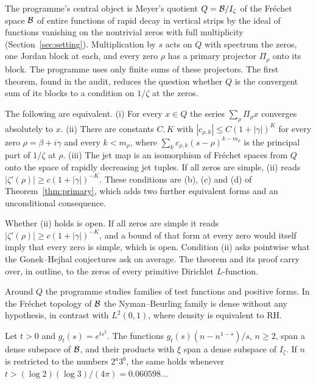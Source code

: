 The programme's central object is Meyer's quotient $Q=\mathcal{B}/I_\zeta$ of the Fréchet space $\mathcal{B}$ of entire functions of rapid decay in vertical strips by the ideal of functions vanishing on the nontrivial zeros with full multiplicity (Section~\ref{sec:setting}). Multiplication by $s$ acts on $Q$ with spectrum the zeros, one Jordan block at each, and every zero $\rho$ has a primary projector $\Pi_\rho$ onto its block. The programme uses only finite sums of these projectors. The first theorem, found in the audit, reduces the question whether $Q$ is the convergent sum of its blocks to a condition on $1/\zeta$ at the zeros.

\begin{introthm}
The following are equivalent.
(i) For every $x\in Q$ the series $\sum_\rho\Pi_\rho x$ converges absolutely to $x$.
(ii) There are constants $C,K$ with $|c_{\rho,k}|\le C(1+|\gamma|)^K$ for every zero $\rho=\beta+i\gamma$ and every $k<m_\rho$, where $\sum_kc_{\rho,k}(s-\rho)^{k-m_\rho}$ is the principal part of $1/\zeta$ at $\rho$.
(iii) The jet map is an isomorphism of Fréchet spaces from $Q$ onto the space of rapidly decreasing jet tuples.
If all zeros are simple, (ii) reads $|\zeta'(\rho)|\ge c(1+|\gamma|)^{-K}$. These conditions are (b), (c) and (d) of Theorem~\ref{thm:primary}, which adds two further equivalent forms and an unconditional consequence.
\end{introthm}

Whether (ii) holds is open. If all zeros are simple it reads $|\zeta'(\rho)|\ge c(1+|\gamma|)^{-K}$, and a bound of that form at every zero would itself imply that every zero is simple, which is open. Condition (ii) asks pointwise what the Gonek--Hejhal conjectures ask on average. The theorem and its proof carry over, in outline, to the zeros of every primitive Dirichlet $L$-function.

Around $Q$ the programme studies families of test functions and positive forms. In the Fréchet topology of $\mathcal{B}$ the Nyman--Beurling family is dense without any hypothesis, in contrast with $L^2(0,1)$, where density is equivalent to RH.

\begin{introthm}
Let $t>0$ and $g_t(s)=e^{ts^2}$. The functions $g_t(s)(n-n^{1-s})/s$, $n\ge2$, span a dense subspace of $\mathcal{B}$, and their products with $\xi$ span a dense subspace of $I_\zeta$. If $n$ is restricted to the numbers $2^a3^b$, the same holds whenever $t>(\log2)(\log3)/(4\pi)=0.060598\ldots$
\end{introthm}

